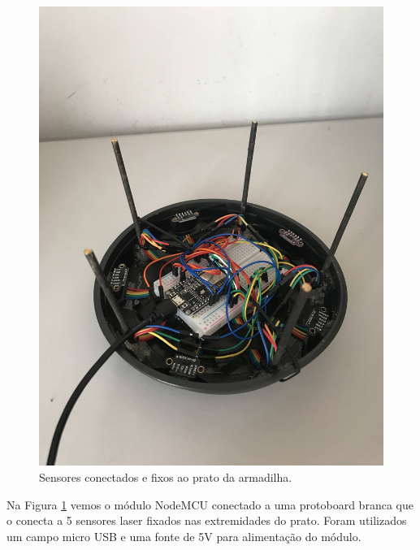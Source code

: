 \documentclass[
	12pt,				%
	openright,			%
	oneside,			%
	a4paper,			%
	chapter=TITLE,		%
	english,			%
	brazil				%
	]{abntex2}
\begin{document}
\begin{figure}[H]
    \centering
    \includegraphics[scale=0.09, angle=-90]{imagens/IMG_0606.jpg}
    \caption{Sensores conectados e fixos ao prato da armadilha.}
    \label{fig:hardwareprato}
\end{figure}   

Na Figura \ref{fig:hardwareprato} vemos o módulo NodeMCU conectado a uma protoboard branca que o conecta a 5 sensores laser
fixados nas extremidades do prato. Foram utilizados um campo micro USB e uma fonte de 5V para alimentação do módulo.
\end{document}
